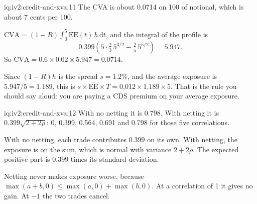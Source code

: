 \begin{solution}{iq:iv2:credit-and-xva:11}
The CVA is about 0.0714 on 100 of notional, which is about 7 cents per 100.

$\mathrm{CVA} = (1 - R)\int_0^5 \mathrm{EE}(t)\, h\,\mathrm{d}t$, and the integral of the profile is
\[
0.399\left(5 \cdot \tfrac{2}{3}\, 5^{3/2} - \tfrac{2}{5}\, 5^{5/2}\right) = 5.947.
\]
So $\mathrm{CVA} = 0.6 \times 0.02 \times 5.947 = 0.0714$.

Since $(1 - R)h$ is the spread $s = 1.2\%$, and the average exposure is $5.947/5 = 1.189$, this is $s \times \overline{\mathrm{EE}} \times T = 0.012 \times 1.189 \times 5$. That is the rule you should say aloud: you are paying a CDS premium on your average exposure.

\end{solution}

\begin{solution}{iq:iv2:credit-and-xva:12}
With no netting it is 0.798. With netting it is $0.399\sqrt{2 + 2\rho}$: 0, 0.399, 0.564, 0.691 and 0.798 for those five correlations.

With no netting, each trade contributes $0.399$ on its own. With netting, the exposure is on the sum, which is normal with variance $2 + 2\rho$. The expected positive part is 0.399 times its standard deviation.

Netting never makes exposure worse, because $\max(a + b, 0) \le \max(a, 0) + \max(b, 0)$. At a correlation of 1 it gives no gain. At $-1$ the two trades cancel.

\end{solution}

